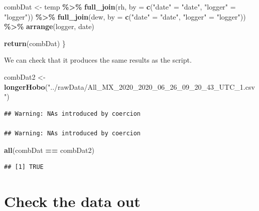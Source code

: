 \documentclass[]{article}
\newenvironment{Shaded}{\begin{snugshade}}{\end{snugshade}}
\newcommand{\DataTypeTok}[1]{\textcolor[rgb]{0.13,0.29,0.53}{#1}}
\newcommand{\KeywordTok}[1]{\textcolor[rgb]{0.13,0.29,0.53}{\textbf{#1}}}
\newcommand{\NormalTok}[1]{#1}
\newcommand{\OperatorTok}[1]{\textcolor[rgb]{0.81,0.36,0.00}{\textbf{#1}}}
\newcommand{\StringTok}[1]{\textcolor[rgb]{0.31,0.60,0.02}{#1}}
\begin{document}
\begin{Shaded}
\begin{Highlighting}[]
\NormalTok{  combDat <{-}}\StringTok{ }\NormalTok{temp }\OperatorTok{\%>\%}\StringTok{ }
\StringTok{  }\KeywordTok{full\_join}\NormalTok{(rh,}
             \DataTypeTok{by =} \KeywordTok{c}\NormalTok{(}\StringTok{"date"}\NormalTok{ =}\StringTok{ "date"}\NormalTok{,}
                    \StringTok{"logger"}\NormalTok{ =}\StringTok{ "logger"}\NormalTok{)) }\OperatorTok{\%>\%}\StringTok{ }
\StringTok{  }\KeywordTok{full\_join}\NormalTok{(dew,}
            \DataTypeTok{by =} \KeywordTok{c}\NormalTok{(}\StringTok{"date"}\NormalTok{ =}\StringTok{ "date"}\NormalTok{,}
                    \StringTok{"logger"}\NormalTok{ =}\StringTok{ "logger"}\NormalTok{)) }\OperatorTok{\%>\%}\StringTok{ }
\StringTok{  }\KeywordTok{arrange}\NormalTok{(logger,}
\NormalTok{          date)}
  
  \KeywordTok{return}\NormalTok{(combDat)}
\NormalTok{\}}
\end{Highlighting}
\end{Shaded}

We can check that it produces the same results as the script.

\begin{Shaded}
\begin{Highlighting}[]
\NormalTok{combDat2 <{-}}\StringTok{ }\KeywordTok{longerHobo}\NormalTok{(}\StringTok{"../rawData/All\_MX\_2020\_2020\_06\_26\_09\_20\_43\_UTC\_1.csv"}\NormalTok{)}
\end{Highlighting}
\end{Shaded}

\begin{verbatim}
## Warning: NAs introduced by coercion

## Warning: NAs introduced by coercion
\end{verbatim}

\begin{Shaded}
\begin{Highlighting}[]
\KeywordTok{all}\NormalTok{(combDat }\OperatorTok{==}\StringTok{ }\NormalTok{combDat2)}
\end{Highlighting}
\end{Shaded}

\begin{verbatim}
## [1] TRUE
\end{verbatim}

\hypertarget{check-the-data-out}{%
\section{Check the data out}\label{check-the-data-out}}
\end{document}

